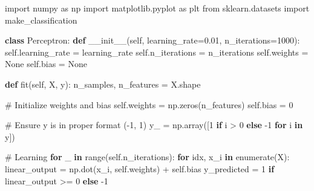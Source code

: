 \documentclass[
  letterpaper,
  DIV=11,
  numbers=noendperiod]{scrreprt}
\newenvironment{Shaded}{\begin{snugshade}}{\end{snugshade}}
\newcommand{\BuiltInTok}[1]{\textcolor[rgb]{0.00,0.23,0.31}{#1}}
\newcommand{\CommentTok}[1]{\textcolor[rgb]{0.37,0.37,0.37}{#1}}
\newcommand{\ControlFlowTok}[1]{\textcolor[rgb]{0.00,0.23,0.31}{\textbf{#1}}}
\newcommand{\DecValTok}[1]{\textcolor[rgb]{0.68,0.00,0.00}{#1}}
\newcommand{\FloatTok}[1]{\textcolor[rgb]{0.68,0.00,0.00}{#1}}
\newcommand{\FunctionTok}[1]{\textcolor[rgb]{0.28,0.35,0.67}{#1}}
\newcommand{\ImportTok}[1]{\textcolor[rgb]{0.00,0.46,0.62}{#1}}
\newcommand{\KeywordTok}[1]{\textcolor[rgb]{0.00,0.23,0.31}{\textbf{#1}}}
\newcommand{\NormalTok}[1]{\textcolor[rgb]{0.00,0.23,0.31}{#1}}
\newcommand{\OperatorTok}[1]{\textcolor[rgb]{0.37,0.37,0.37}{#1}}
\newcommand{\VariableTok}[1]{\textcolor[rgb]{0.07,0.07,0.07}{#1}}
\begin{document}
\begin{Shaded}
\begin{Highlighting}[]
\ImportTok{import}\NormalTok{ numpy }\ImportTok{as}\NormalTok{ np}
\ImportTok{import}\NormalTok{ matplotlib.pyplot }\ImportTok{as}\NormalTok{ plt}
\ImportTok{from}\NormalTok{ sklearn.datasets }\ImportTok{import}\NormalTok{ make\_classification}

\KeywordTok{class}\NormalTok{ Perceptron:}
    \KeywordTok{def} \FunctionTok{\_\_init\_\_}\NormalTok{(}\VariableTok{self}\NormalTok{, learning\_rate}\OperatorTok{=}\FloatTok{0.01}\NormalTok{, n\_iterations}\OperatorTok{=}\DecValTok{1000}\NormalTok{):}
        \VariableTok{self}\NormalTok{.learning\_rate }\OperatorTok{=}\NormalTok{ learning\_rate}
        \VariableTok{self}\NormalTok{.n\_iterations }\OperatorTok{=}\NormalTok{ n\_iterations}
        \VariableTok{self}\NormalTok{.weights }\OperatorTok{=} \VariableTok{None}
        \VariableTok{self}\NormalTok{.bias }\OperatorTok{=} \VariableTok{None}
    
    \KeywordTok{def}\NormalTok{ fit(}\VariableTok{self}\NormalTok{, X, y):}
\NormalTok{        n\_samples, n\_features }\OperatorTok{=}\NormalTok{ X.shape}
        
        \CommentTok{\# Initialize weights and bias}
        \VariableTok{self}\NormalTok{.weights }\OperatorTok{=}\NormalTok{ np.zeros(n\_features)}
        \VariableTok{self}\NormalTok{.bias }\OperatorTok{=} \DecValTok{0}
        
        \CommentTok{\# Ensure y is in proper format ({-}1, 1)}
\NormalTok{        y\_ }\OperatorTok{=}\NormalTok{ np.array([}\DecValTok{1} \ControlFlowTok{if}\NormalTok{ i }\OperatorTok{\textgreater{}} \DecValTok{0} \ControlFlowTok{else} \OperatorTok{{-}}\DecValTok{1} \ControlFlowTok{for}\NormalTok{ i }\KeywordTok{in}\NormalTok{ y])}
        
        \CommentTok{\# Learning}
        \ControlFlowTok{for}\NormalTok{ \_ }\KeywordTok{in} \BuiltInTok{range}\NormalTok{(}\VariableTok{self}\NormalTok{.n\_iterations):}
            \ControlFlowTok{for}\NormalTok{ idx, x\_i }\KeywordTok{in} \BuiltInTok{enumerate}\NormalTok{(X):}
\NormalTok{                linear\_output }\OperatorTok{=}\NormalTok{ np.dot(x\_i, }\VariableTok{self}\NormalTok{.weights) }\OperatorTok{+} \VariableTok{self}\NormalTok{.bias}
\NormalTok{                y\_predicted }\OperatorTok{=} \DecValTok{1} \ControlFlowTok{if}\NormalTok{ linear\_output }\OperatorTok{\textgreater{}=} \DecValTok{0} \ControlFlowTok{else} \OperatorTok{{-}}\DecValTok{1}
                

\end{Highlighting}
\end{Shaded}
\end{document}
